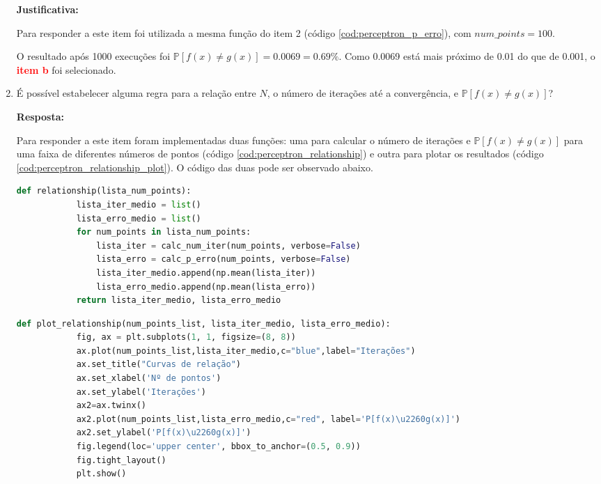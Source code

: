 \begin{enumerate}
    \par

    \textbf{Justificativa:}

    Para responder a este item foi utilizada a mesma função do item 2 (código \ref{cod:perceptron_p_erro}), com $num\_points = 100$.

    O resultado após 1000 execuções foi  $\mathbb{P}[f(x) \neq g(x)] = 0.0069 = 0.69\%$. Como 0.0069 está mais próximo de 0.01 do que de 0.001, o \textcolor{red}{\textbf{item b}} foi selecionado. 
     
    
    \item  É possível estabelecer alguma regra para a relação entre $N$, o número de iterações até a convergência,
    e $\mathbb{P}[f(x) \neq g(x)]$?

    \par

    \textbf{Resposta:}

    Para responder a este item foram implementadas duas funções: uma para calcular o número de iterações e $\mathbb{P}[f(x) \neq g(x)]$ para uma faixa de diferentes números de pontos (código \ref{cod:perceptron_relationship}) e outra para plotar os resultados (código \ref{cod:perceptron_relationship_plot}). O código das duas pode ser observado abaixo.


    \begin{lstlisting}[language=Python, caption=Cálculo da probabilidade de erro e do número de iterações, label=cod:perceptron_relationship]
        def relationship(lista_num_points):
            lista_iter_medio = list()
            lista_erro_medio = list()
            for num_points in lista_num_points:
                lista_iter = calc_num_iter(num_points, verbose=False)
                lista_erro = calc_p_erro(num_points, verbose=False)
                lista_iter_medio.append(np.mean(lista_iter))  
                lista_erro_medio.append(np.mean(lista_erro))
            return lista_iter_medio, lista_erro_medio
    \end{lstlisting}

    \begin{lstlisting}[language=Python, caption=Plot da probabilidade de erro e do número de iterações, label=cod:perceptron_relationship_plot]
        def plot_relationship(num_points_list, lista_iter_medio, lista_erro_medio):
            fig, ax = plt.subplots(1, 1, figsize=(8, 8))
            ax.plot(num_points_list,lista_iter_medio,c="blue",label="Iterações")
            ax.set_title("Curvas de relação")
            ax.set_xlabel('Nº de pontos')
            ax.set_ylabel('Iterações')
            ax2=ax.twinx()
            ax2.plot(num_points_list,lista_erro_medio,c="red", label='P[f(x)\u2260g(x)]')
            ax2.set_ylabel('P[f(x)\u2260g(x)]')
            fig.legend(loc='upper center', bbox_to_anchor=(0.5, 0.9))
            fig.tight_layout()
            plt.show()
    \end{lstlisting}


\end{enumerate}
